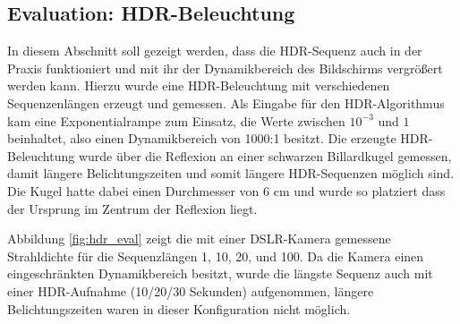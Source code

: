      

    \subsection{Evaluation: HDR-Beleuchtung} 
      In diesem Abschnitt soll gezeigt werden, dass die HDR-Sequenz auch in der Praxis funktioniert und mit ihr der Dynamikbereich des Bildschirms vergrößert werden kann.
      Hierzu wurde eine HDR-Beleuchtung mit verschiedenen Sequenzenlängen erzeugt und gemessen. 
      Als Eingabe für den HDR-Algorithmus kam eine Exponentialrampe zum Einsatz, die Werte zwischen $10^{-3}$ und $1$ beinhaltet, also einen Dynamikbereich von 1000:1 besitzt.
      Die erzeugte HDR-Beleuchtung wurde über die Reflexion an einer schwarzen Billardkugel gemessen, damit längere Belichtungszeiten und somit längere HDR-Sequenzen möglich sind. 
      Die Kugel hatte dabei einen Durchmesser von 6 cm und wurde so platziert dass der Ursprung im Zentrum der Reflexion liegt. 
   
   \pagebreak
      Abbildung \ref{fig:hdr_eval} zeigt die mit einer DSLR-Kamera gemessene Strahldichte für die Sequenzlängen 1, 10, 20, und 100.
      Da die Kamera einen eingeschränkten Dynamikbereich besitzt, wurde die längste Sequenz auch mit einer HDR-Aufnahme (10/20/30 Sekunden) aufgenommen,
      längere Belichtungszeiten waren in dieser Konfiguration nicht möglich.
     
